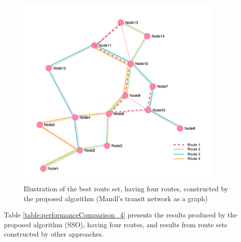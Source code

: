 \begin{figure}[H]
    \begin{center}
    \includegraphics[width=4in]{assets/mandlnetwork_4routes.png}
    \end{center}
    \caption{Illustration of the best route set, having four routes, constructed by the proposed algorithm (Mandl's transit network as a graph)}
    \label{fig:bestRouteSet4} 
\end{figure}

Table \vref{table:performanceComparison_4} presents the results produced by the proposed algorithm (SSO), having four routes, and results from route sets constructed by other approaches.

